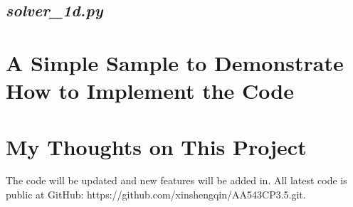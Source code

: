 \documentclass[11pt]{article}
\begin{document}
    \subsection{\textbf{\textit{solver\_1d.py}}}
\section{A Simple Sample to Demonstrate How to Implement the Code} 
\section{My Thoughts on This Project}

The code will be updated and new features will be added in. 
All latest code is public at GitHub: https://github.com/xinshengqin/AA543CP3.5.git. 
\end{document}
